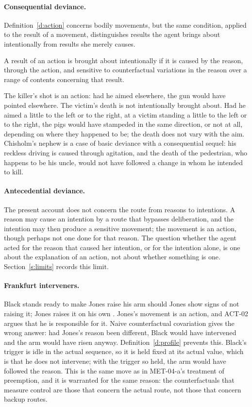 \documentclass{situationist-preprint}
\begin{document}
\paragraph{Consequential deviance.} Definition~\ref{d:action} concerns bodily movements, but the same condition, applied to the result of a movement, distinguishes results the agent brings about intentionally from results she merely causes.

\begin{remark}\label{r:result}
A result of an action is brought about intentionally if it is caused by the reason, through the action, and sensitive to counterfactual variations in the reason over a range of contents concerning that result.
\end{remark}

The killer's shot is an action: had he aimed elsewhere, the gun would have pointed elsewhere. The victim's death is not intentionally brought about. Had he aimed a little to the left or to the right, at a victim standing a little to the left or to the right, the pigs would have stampeded in the same direction, or not at all, depending on where they happened to be; the death does not vary with the aim. Chisholm's nephew is a case of basic deviance with a consequential sequel: his reckless driving is caused through agitation, and the death of the pedestrian, who happens to be his uncle, would not have followed a change in whom he intended to kill.

\paragraph{Antecedential deviance.} The present account does not concern the route from reasons to intentions. A reason may cause an intention by a route that bypasses deliberation, and the intention may then produce a sensitive movement; the movement is an action, though perhaps not one done for that reason. The question whether the agent acted for the reason that caused her intention, or for the intention alone, is one about the explanation of an action, not about whether something is one. Section~\ref{s:limits} records this limit.

\paragraph{Frankfurt interveners.} Black stands ready to make Jones raise his arm should Jones show signs of not raising it; Jones raises it on his own \citep{Frankfurt1969}. Jones's movement is an action, and ACT-02 argues that he is responsible for it. Naive counterfactual covariation gives the wrong answer: had Jones's reason been different, Black would have intervened and the arm would have risen anyway. Definition~\ref{d:profile} prevents this. Black's trigger is idle in the actual sequence, so it is held fixed at its actual value, which is that he does not intervene; with the trigger so held, the arm would have followed the reason. This is the same move as in MET-04-a's treatment of preemption, and it is warranted for the same reason: the counterfactuals that measure control are those that concern the actual route, not those that concern backup routes.
\end{document}
